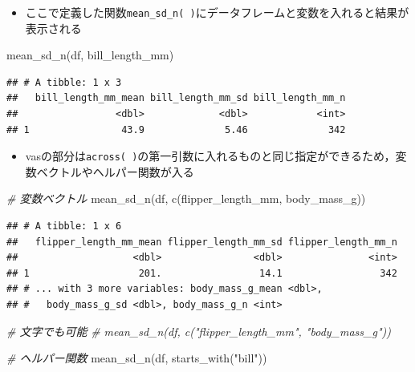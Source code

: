 \documentclass[
  xelatex,ja=standard, b5paper]{bxjsbook}
\newenvironment{Shaded}{\begin{snugshade}}{\end{snugshade}}
\newcommand{\CommentTok}[1]{\textcolor[rgb]{0.56,0.35,0.01}{\textit{#1}}}
\newcommand{\FunctionTok}[1]{\textcolor[rgb]{0.00,0.00,0.00}{#1}}
\newcommand{\NormalTok}[1]{#1}
\newcommand{\StringTok}[1]{\textcolor[rgb]{0.31,0.60,0.02}{#1}}
\providecommand{\tightlist}{%
  \setlength{\itemsep}{0pt}\setlength{\parskip}{0pt}}
\begin{document}
\begin{itemize}
\tightlist
\item
  ここで定義した関数\texttt{mean\_sd\_n(\ )}にデータフレームと変数を入れると結果が表示される
\end{itemize}

\begin{Shaded}
\begin{Highlighting}[]
\FunctionTok{mean\_sd\_n}\NormalTok{(df, bill\_length\_mm)}
\end{Highlighting}
\end{Shaded}

\begin{verbatim}
## # A tibble: 1 x 3
##   bill_length_mm_mean bill_length_mm_sd bill_length_mm_n
##                 <dbl>             <dbl>            <int>
## 1                43.9              5.46              342
\end{verbatim}

\begin{itemize}
\tightlist
\item
  vasの部分は\texttt{across(\ )}の第一引数に入れるものと同じ指定ができるため，変数ベクトルやヘルパー関数が入る
\end{itemize}

\begin{Shaded}
\begin{Highlighting}[]
\CommentTok{\# 変数ベクトル}
\FunctionTok{mean\_sd\_n}\NormalTok{(df, }\FunctionTok{c}\NormalTok{(flipper\_length\_mm, body\_mass\_g))}
\end{Highlighting}
\end{Shaded}

\begin{verbatim}
## # A tibble: 1 x 6
##   flipper_length_mm_mean flipper_length_mm_sd flipper_length_mm_n
##                    <dbl>                <dbl>               <int>
## 1                   201.                 14.1                 342
## # ... with 3 more variables: body_mass_g_mean <dbl>,
## #   body_mass_g_sd <dbl>, body_mass_g_n <int>
\end{verbatim}

\begin{Shaded}
\begin{Highlighting}[]
\CommentTok{\# 文字でも可能}
\CommentTok{\# mean\_sd\_n(df, c("flipper\_length\_mm", "body\_mass\_g"))}

\CommentTok{\# ヘルパー関数}
\FunctionTok{mean\_sd\_n}\NormalTok{(df, }\FunctionTok{starts\_with}\NormalTok{(}\StringTok{"bill"}\NormalTok{))}
\end{Highlighting}
\end{Shaded}
\end{document}

